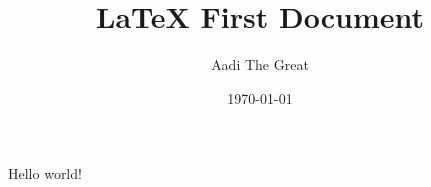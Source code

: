 \documentclass{article}
\title{LaTeX First Document}
\author{Aadi The Great}
\date{\today}
\begin{document}
\maketitle
Hello world!
\end{document}
